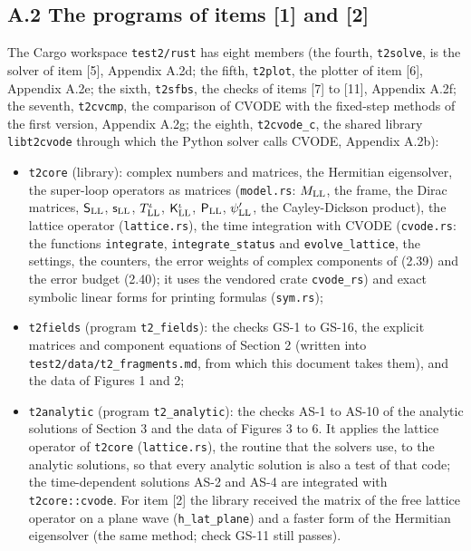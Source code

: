 \documentclass[
  10pt,
]{article}
\providecommand{\tightlist}{%
  \setlength{\itemsep}{0pt}\setlength{\parskip}{0pt}}
\begin{document}
\hypertarget{a.2-the-programs-of-items-1-and-2}{%
\subsection{A.2 The programs of items {[}1{]} and
{[}2{]}}\label{a.2-the-programs-of-items-1-and-2}}

The Cargo workspace \texttt{test2/rust} has eight members (the fourth,
\texttt{t2solve}, is the solver of item {[}5{]}, Appendix A.2d; the
fifth, \texttt{t2plot}, the plotter of item {[}6{]}, Appendix A.2e; the
sixth, \texttt{t2sfbs}, the checks of items {[}7{]} to {[}11{]},
Appendix A.2f; the seventh, \texttt{t2cvcmp}, the comparison of CVODE
with the fixed-step methods of the first version, Appendix A.2g; the
eighth, \texttt{t2cvode\_c}, the shared library \texttt{libt2cvode}
through which the Python solver calls CVODE, Appendix A.2b):

\begin{itemize}
\tightlist
\item
  \texttt{t2core} (library): complex numbers and matrices, the Hermitian
  eigensolver, the super-loop operators as matrices (\texttt{model.rs}:
  \(M_{\rm LL}\), the frame, the Dirac matrices, \(\mathsf S_{\rm LL}\),
  \(\mathsf s_{\rm LL}\), \(T^\iota_{\rm LL}\),
  \(\mathsf K^\iota_{\rm LL}\), \(\mathsf P_{\rm LL}\),
  \(\psi'_{\rm LL}\), the Cayley-Dickson product), the lattice operator
  (\texttt{lattice.rs}), the time integration with CVODE
  (\texttt{cvode.rs}: the functions \texttt{integrate},
  \texttt{integrate\_status} and \texttt{evolve\_lattice}, the settings,
  the counters, the error weights of complex components of (2.39) and
  the error budget (2.40); it uses the vendored crate
  \texttt{cvode\_rs}) and exact symbolic linear forms for printing
  formulas (\texttt{sym.rs});
\item
  \texttt{t2fields} (program \texttt{t2\_fields}): the checks GS-1 to
  GS-16, the explicit matrices and component equations of Section 2
  (written into \texttt{test2/data/t2\_fragments.md}, from which this
  document takes them), and the data of Figures 1 and 2;
\item
  \texttt{t2analytic} (program \texttt{t2\_analytic}): the checks AS-1
  to AS-10 of the analytic solutions of Section 3 and the data of
  Figures 3 to 6. It applies the lattice operator of \texttt{t2core}
  (\texttt{lattice.rs}), the routine that the solvers use, to the
  analytic solutions, so that every analytic solution is also a test of
  that code; the time-dependent solutions AS-2 and AS-4 are integrated
  with \texttt{t2core::cvode}. For item {[}2{]} the library received the
  matrix of the free lattice operator on a plane wave
  (\texttt{h\_lat\_plane}) and a faster form of the Hermitian
  eigensolver (the same method; check GS-11 still passes).
\end{itemize}
\end{document}
